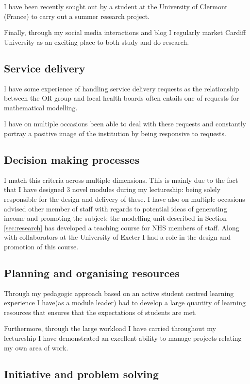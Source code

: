 \documentclass{article}
\begin{document}
I have been recently sought out by a student at the University of Clermont (France) to carry out a summer research project.

Finally, through my social media interactions and blog I regularly market Cardiff University as an exciting place to both study and do research.

\subsection{Service delivery}

I have some experience of handling service delivery requests as the relationship between the OR group and local health boards often entails one of requests for mathematical modelling.

I have on multiple occasions been able to deal with these requests and constantly portray a positive image of the institution by being responsive to requests.

\subsection{Decision making processes}

I match this criteria across multiple dimensions.
This is mainly due to the fact that I have designed 3 novel modules during my lectureship: being solely responsible for the design and delivery of these.
I have also on multiple occasions advised other member of staff with regards to potential ideas of generating income and promoting the subject: the modelling unit described in Section \ref{sec:research} has developed a teaching course for NHS members of staff.
Along with collaborators at the University of Exeter I had a role in the design and promotion of this course.

\subsection{Planning and organising resources}

Through my pedagogic approach based on an active student centred learning experience I have(as a module leader) had to develop a large quantity of learning resources that ensures that the expectations of students are met.

Furthermore, through the large workload I have carried throughout my lectureship I have demonstrated an excellent ability to manage projects relating my own area of work.

\subsection{Initiative and problem solving}
\end{document}
